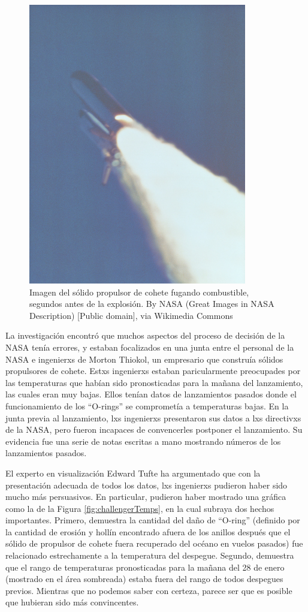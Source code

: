 \documentclass[
  12pt,
]{book}
\begin{document}
\begin{figure}
\includegraphics[height=0.2\textheight]{images/Booster_Rocket_Breach_-_GPN-2000-001425} \caption{Imagen del sólido propulsor de cohete fugando combustible, segundos antes de la explosión. By NASA (Great Images in NASA Description) [Public domain], via Wikimedia Commons}\label{fig:srbLeak}
\end{figure}

La investigación encontró que muchos aspectos del proceso de decisión de la NASA tenía errores, y estaban focalizados en una junta entre el personal de la NASA e ingenierxs de Morton Thiokol, un empresario que construía sólidos propulsores de cohete. Estxs ingenierxs estaban paricularmente preocupades por las temperaturas que habían sido pronosticadas para la mañana del lanzamiento, las cuales eran muy bajas. Ellos tenían datos de lanzamientos pasados donde el funcionamiento de los ``O-rings'' se comprometía a temperaturas bajas. En la junta previa al lanzamiento, lxs ingenierxs presentaron sus datos a lxs directivxs de la NASA, pero fueron incapaces de convencerles postponer el lanzamiento. Su evidencia fue una serie de notas escritas a mano mostrando números de los lanzamientos pasados.

El experto en visualización Edward Tufte ha argumentado que con la presentación adecuada de todos los datos, lxs ingenierxs pudieron haber sido mucho más persuasivos. En particular, pudieron haber mostrado una gráfica como la de la Figura \ref{fig:challengerTemps}, en la cual subraya dos hechos importantes. Primero, demuestra la cantidad del daño de ``O-ring'' (definido por la cantidad de erosión y hollín encontrado afuera de los anillos después que el sólido de propulsor de cohete fuera recuperado del océano en vuelos pasados) fue relacionado estrechamente a la temperatura del despegue. Segundo, demuestra que el rango de temperaturas pronosticadas para la mañana del 28 de enero (mostrado en el área sombreada) estaba fuera del rango de todos despegues previos. Mientras que no podemos saber con certeza, parece ser que es posible que hubieran sido más convincentes.
\end{document}
